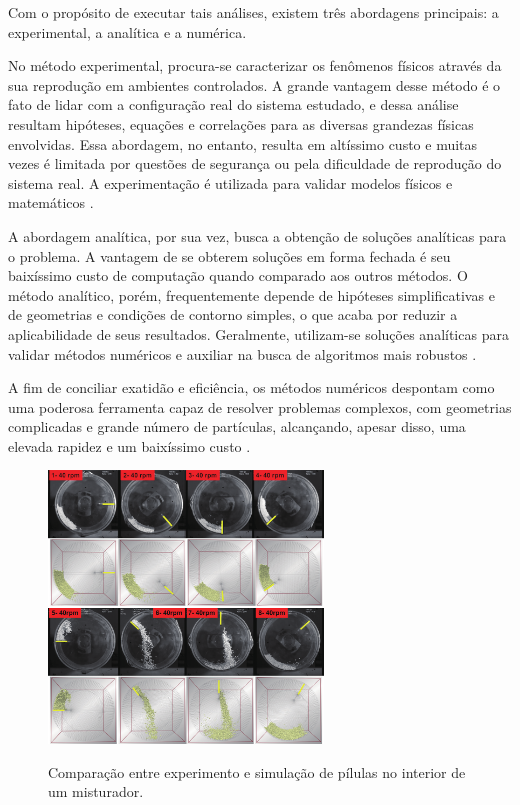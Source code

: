 Com o propósito de executar tais análises, existem três abordagens principais: a experimental, a analítica e a numérica. 

No método experimental, procura-se caracterizar os fenômenos físicos através da sua reprodução em ambientes controlados. A grande vantagem desse método é o fato de lidar com a configuração real do sistema estudado, e dessa análise resultam hipóteses, equações e correlações para as diversas grandezas físicas envolvidas. Essa abordagem, no entanto, resulta em altíssimo custo e muitas vezes é limitada por questões de segurança ou pela dificuldade de reprodução do sistema real. A experimentação é utilizada para validar modelos físicos e matemáticos \cite{bib:maliska}.

A abordagem analítica, por sua vez, busca a obtenção de soluções analíticas para o problema. A vantagem de se obterem soluções em forma fechada é seu baixíssimo custo de computação quando comparado aos outros métodos. O método analítico, porém, frequentemente depende de hipóteses simplificativas e de geometrias e condições de contorno simples, o que acaba por reduzir a aplicabilidade de seus resultados. Geralmente, utilizam-se soluções analíticas para validar métodos numéricos e auxiliar na busca de algoritmos mais robustos \cite{bib:maliska}.

A fim de conciliar exatidão e eficiência, os métodos numéricos despontam como uma poderosa ferramenta capaz de resolver problemas complexos, com geometrias complicadas e grande número de partículas, alcançando, apesar disso, uma elevada rapidez e um baixíssimo custo \cite{bib:maliska}.

\begin{figure}[h]
	\caption{Comparação entre experimento e simulação de pílulas no interior de um misturador.}
	\vspace{-0.5cm}
	\centering
		\includegraphics[width=0.65\textwidth]{images/introduction/pellet_flow.png}
	\vspace{-0.2cm}
	\label{fig:pellet_flow}
\end{figure}

